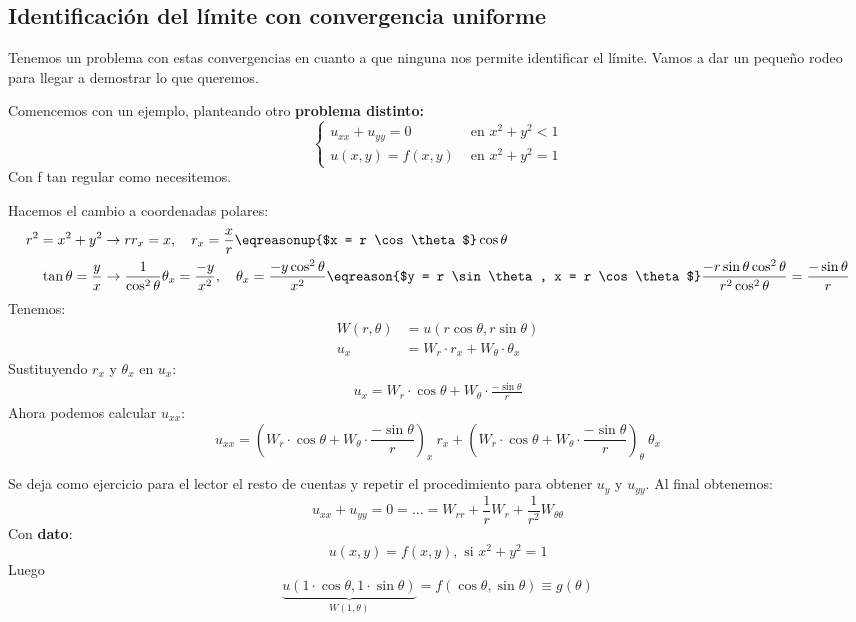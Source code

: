 		\subsection{Identificación del límite con convergencia uniforme}

		Tenemos un problema con estas convergencias en cuanto a que ninguna nos permite identificar el límite. Vamos a dar un pequeño rodeo para llegar a demostrar lo que queremos.

		Comencemos con un ejemplo, planteando otro \textbf{problema distinto:}
		\[
			\begin{cases}
				u_{xx} + u_{yy} = 0 & \text{ en } x^2 + y^2 < 1 \\
				u(x,y) = f(x,y) & \text{ en } x^2 + y^2 = 1
			\end{cases}
		\]
		Con f tan regular como necesitemos.

		Hacemos el cambio a coordenadas polares:
		\begin{align*}
		 r^2 = x^2 + y^2  &\rightarrow rr_x = x , \quad r_x = \frac{x}{r} \eqreasonup{$x = r \cos \theta $} \cos \theta \\
		 \tan \theta = \frac{y}{x}  &\rightarrow \frac{1}{\cos^2 \theta} \theta_x = \frac{-y}{x^2}, \quad \theta_x = \frac{-y \cos^2\theta}{x^2} \eqreason{$y = r \sin \theta, x = r \cos \theta$} \frac{-r \sin \theta \cos^2 \theta}{r^2 \cos^2 \theta} = \frac{- \sin \theta}{r}
		\end{align*}
		Tenemos:
		\begin{align*}
			W(r, \theta) &= u(r \cos \theta, r \sin \theta)\\
			u_x &= W_r \cdot r_x + W_\theta \cdot \theta_x
		\end{align*}
		Sustituyendo $r_x$ y $\theta_x$ en $u_x$:
		\begin{align*}
			u_x = W_r \cdot \cos \theta + W_\theta \cdot \frac{- \sin \theta}{r}
		\end{align*}
		Ahora podemos calcular $u_{xx}$:
		$$ u_{xx} = (W_r \cdot \cos \theta + W_\theta \cdot \frac{- \sin \theta}{r})_x \ r_x + (W_r \cdot \cos \theta + W_\theta \cdot \frac{- \sin \theta}{r})_\theta \ \theta_x$$

		Se deja como ejercicio para el lector el resto de cuentas y repetir el procedimiento para obtener $u_y$ y $u_{yy}$. Al final obtenemos:
		$$ u_{xx} + u_{yy} = 0 = \dots = W_{rr} + \frac{1}{r}W_r + \frac{1}{r^2}W_{\theta\theta}$$
		Con \textbf{dato}:
		\[ u(x,y) = f(x,y), \text{ si } x^2 + y^2 = 1\]
		Luego
		\[ \underbrace{u(1 \cdot \cos \theta,1 \cdot \sin \theta)}_{W(1,\theta)} = f(\cos \theta, \sin \theta) \equiv g(\theta)\]

